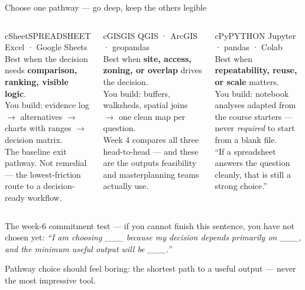 \documentclass[aspectratio=169,10pt]{beamer}
\newcommand{\muted}[1]{{\color{cMute}#1}}
\begin{document}
\begin{frame}{Choose one pathway --- go deep, keep the others legible}
  \begin{columns}[T]
    \begin{pathcard}{cSheet}{SPREADSHEET}
      \scriptsize Excel · Google Sheets\\[2pt]
      Best when the decision needs \textbf{comparison, ranking,
      visible logic}.\\[2pt]
      You build: evidence log \(\rightarrow\) alternatives \(\rightarrow\)
      charts with ranges \(\rightarrow\) decision matrix.\\[2pt]
      \muted{The baseline exit pathway. Not remedial --- the
      lowest-friction route to a decision-ready workflow.}
    \end{pathcard}
    \begin{pathcard}{cGIS}{GIS}
      \scriptsize QGIS · ArcGIS · geopandas\\[2pt]
      Best when \textbf{site, access, zoning, or overlap} drives
      the decision.\\[2pt]
      You build: buffers, walksheds, spatial joins \(\rightarrow\) one clean
      map per question.\\[2pt]
      \muted{Week 4 compares all three head-to-head --- and these are the
      outputs feasibility and masterplanning teams actually use.}
    \end{pathcard}
    \begin{pathcard}{cPy}{PYTHON}
      \scriptsize Jupyter · pandas · Colab\\[2pt]
      Best when \textbf{repeatability, reuse, or scale}
      matters.\\[2pt]
      You build: notebook analyses adapted from the course starters ---
      never \emph{required} to start from a blank file.\\[2pt]
      \muted{``If a spreadsheet answers the question cleanly,
      that is still a strong choice.''}
    \end{pathcard}
  \end{columns}
  \vspace{1.5mm}
  \footnotesize
  The week-6 commitment test --- if you cannot finish this sentence, you have
  not chosen yet: \emph{``I am choosing \_\_\_ because my decision depends
  primarily on \_\_\_, and the minimum useful output will be \_\_\_.''}\par
  \vspace{.8mm}
  \alert{Pathway choice should feel boring:} the shortest path to a useful
  output --- never the most impressive tool.
\end{frame}
\end{document}
